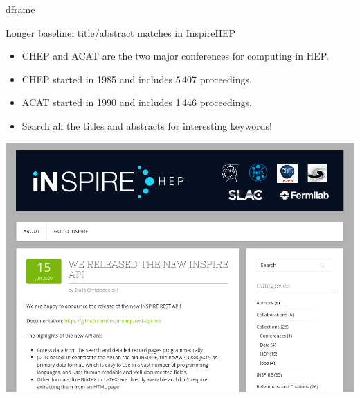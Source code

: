 \documentclass[aspectratio=169]{beamer}
\begin{document}
d{frame}

\begin{frame}{Longer baseline: title/abstract matches in InspireHEP}
\vspace{0.5 cm}
\begin{itemize}
\item CHEP and ACAT are the two major conferences for computing in HEP.
\item CHEP started in 1985 and includes 5\,407 proceedings.
\item ACAT started in 1990 and includes 1\,446 proceedings.
\item Search all the titles and abstracts for interesting keywords!
\end{itemize}

\vspace{0.25 cm}
\begin{center}
\includegraphics[width=0.5\linewidth]{inspirehep-api-website.png}
\end{center}
\end{frame}
\end{document}
